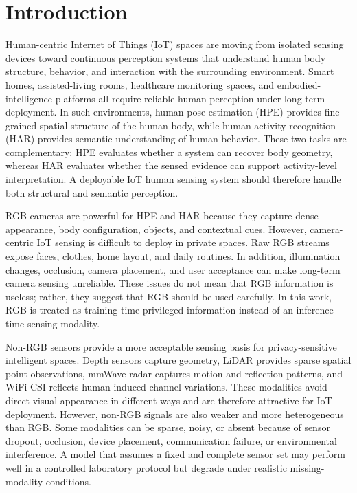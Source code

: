 \documentclass[journal]{IEEEtran}
\begin{document}
\section{Introduction}

Human-centric Internet of Things (IoT) spaces are moving from isolated sensing devices toward continuous perception systems that understand human body structure, behavior, and interaction with the surrounding environment. Smart homes, assisted-living rooms, healthcare monitoring spaces, and embodied-intelligence platforms all require reliable human perception under long-term deployment. In such environments, human pose estimation (HPE) provides fine-grained spatial structure of the human body, while human activity recognition (HAR) provides semantic understanding of human behavior. These two tasks are complementary: HPE evaluates whether a system can recover body geometry, whereas HAR evaluates whether the sensed evidence can support activity-level interpretation. A deployable IoT human sensing system should therefore handle both structural and semantic perception.

RGB cameras are powerful for HPE and HAR because they capture dense appearance, body configuration, objects, and contextual cues. However, camera-centric IoT sensing is difficult to deploy in private spaces. Raw RGB streams expose faces, clothes, home layout, and daily routines. In addition, illumination changes, occlusion, camera placement, and user acceptance can make long-term camera sensing unreliable. These issues do not mean that RGB information is useless; rather, they suggest that RGB should be used carefully. In this work, RGB is treated as training-time privileged information instead of an inference-time sensing modality.

Non-RGB sensors provide a more acceptable sensing basis for privacy-sensitive intelligent spaces. Depth sensors capture geometry, LiDAR provides sparse spatial point observations, mmWave radar captures motion and reflection patterns, and WiFi-CSI reflects human-induced channel variations. These modalities avoid direct visual appearance in different ways and are therefore attractive for IoT deployment. However, non-RGB signals are also weaker and more heterogeneous than RGB. Some modalities can be sparse, noisy, or absent because of sensor dropout, occlusion, device placement, communication failure, or environmental interference. A model that assumes a fixed and complete sensor set may perform well in a controlled laboratory protocol but degrade under realistic missing-modality conditions.
\end{document}
